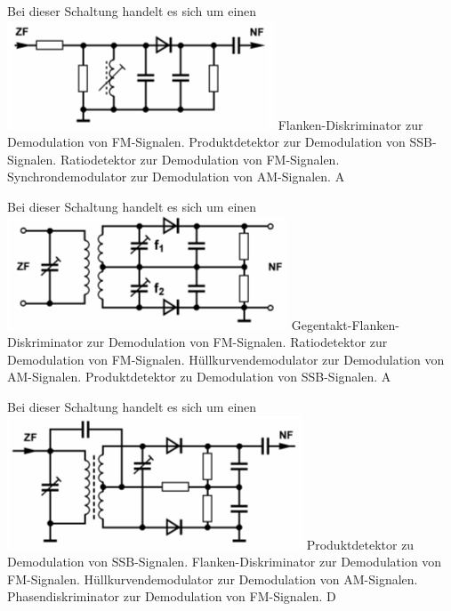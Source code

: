 {Bei dieser Schaltung handelt es sich um einen \\ \includegraphics[scale=0.5]{Modulation/Bilder/TD505.png}}%
{Flanken-Diskriminator zur Demodulation von FM-Signalen.}%
{Produktdetektor zur Demodulation von SSB-Signalen.}%
{Ratiodetektor zur Demodulation von FM-Signalen.}%
{Synchrondemodulator zur Demodulation von AM-Signalen.}%
{A}%

{Bei dieser Schaltung handelt es sich um einen \\ \includegraphics[scale=0.6]{Modulation/Bilder/TD506.png}}%
{Gegentakt-Flanken-Diskriminator zur Demodulation von FM-Signalen.}%
{Ratiodetektor zur Demodulation von FM-Signalen.}%
{Hüllkurvendemodulator zur Demodulation von AM-Signalen.}%
{Produktdetektor zu Demodulation von SSB-Signalen.}%
{A}%

{Bei dieser Schaltung handelt es sich um einen \\ \includegraphics[scale=0.5]{Modulation/Bilder/TD507.png}}%
{Produktdetektor zu Demodulation von SSB-Signalen.}%
{Flanken-Diskriminator zur Demodulation von FM-Signalen.}%
{Hüllkurvendemodulator zur Demodulation von AM-Signalen.}%
{Phasendiskriminator zur Demodulation von FM-Signalen.}%
{D}%

